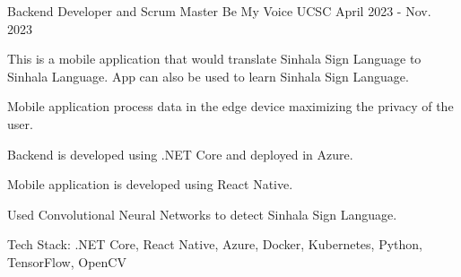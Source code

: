 

\begin{cventries}

  \cventry
    {Backend Developer and Scrum Master} %
    {Be My Voice} %
    {UCSC} %
    {April 2023 - Nov. 2023} %
    {
      \begin{cvitems} %
        \item {This is a mobile application that would translate Sinhala Sign Language to Sinhala Language. App can also be used to learn Sinhala Sign Language.}
        \item {Mobile application process data in the edge device maximizing the privacy of the user.}
        \item {Backend is developed using .NET Core and deployed in Azure.}
        \item {Mobile application is developed using React Native.}
        \item {Used Convolutional Neural Networks to detect Sinhala Sign Language.}
        \item {Tech Stack: .NET Core, React Native, Azure, Docker, Kubernetes, Python, TensorFlow, OpenCV}
      \end{cvitems}
    }


\end{cventries}
